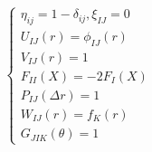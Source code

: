 \documentclass[12pt]{article}
\begin{document}
\begin{eqnarray*}
\left\{\begin{array}{l}
\eta_{ij}=1-\delta_{ij},\xi_{IJ}=0 \\
U_{IJ}\left(r\right)=\phi_{IJ}\left(r\right) \\
V_{IJ}\left(r\right)=1 \\
F_{II}\left(X\right)=-2F_I\left(X\right) \\
P_{IJ}\left(\Delta r\right)=1 \\ 
W_{IJ}\left(r\right)=f_{K}\left(r\right) \\
G_{JIK}\left(\theta\right)=1
\end{array}\right.
\end{eqnarray*} 
\end{document}
